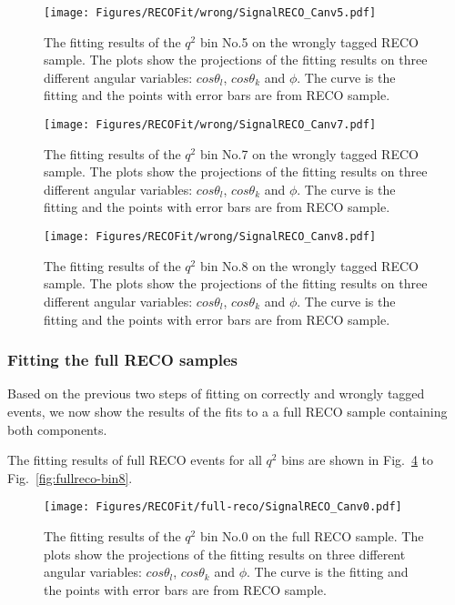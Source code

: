 \begin{figure}[!hbt]
  \centering
  \texttt{[image: Figures/RECOFit/wrong/SignalRECO\_Canv5.pdf]}
  \caption{The fitting results of the $q^2$ bin No.5 on the wrongly
    tagged RECO  sample. The plots show the projections of the fitting results on
    three different angular variables: $cos\theta_l$, $cos\theta_k$
    and $\phi$. The curve is the fitting and the points with error
    bars are from RECO sample. } 
  \label{fig:wtag-bin5}
\end{figure}

\begin{figure}[!hbt]
  \centering
  \texttt{[image: Figures/RECOFit/wrong/SignalRECO\_Canv7.pdf]}
  \caption{The fitting results of the $q^2$ bin No.7 on the wrongly
    tagged RECO  sample. The plots show the projections of the fitting results on
    three different angular variables: $cos\theta_l$, $cos\theta_k$
    and $\phi$. The curve is the fitting and the points with error
    bars are from RECO sample. } 
  \label{fig:wtag-bin7}
\end{figure}

\begin{figure}[!hbt]
  \centering
  \texttt{[image: Figures/RECOFit/wrong/SignalRECO\_Canv8.pdf]}
  \caption{The fitting results of the $q^2$ bin No.8 on the wrongly
    tagged RECO  sample. The plots show the projections of the fitting results on
    three different angular variables: $cos\theta_l$, $cos\theta_k$
    and $\phi$. The curve is the fitting and the points with error
    bars are from RECO sample. } 
  \label{fig:wtag-bin8}
\end{figure}

\clearpage

\subsubsection{Fitting the full RECO samples}
\label{sec:fitval-reco-full}

Based on the previous two steps of fitting on correctly and wrongly tagged events,
we now show the results of the fits to a a full RECO sample containing both components.

The fitting results of full RECO events for all $q^2$ bins are
shown in Fig.~\ref{fig:fullreco-bin0} to Fig.~\ref{fig:fullreco-bin8}.


\begin{figure}[!hbt]
  \centering
  \texttt{[image: Figures/RECOFit/full-reco/SignalRECO\_Canv0.pdf]}
  \caption{The fitting results of the $q^2$ bin No.0 on the full RECO
    sample. The plots show the projections of the fitting results on
    three different angular variables: $cos\theta_l$, $cos\theta_k$
    and $\phi$. The curve is the fitting and the points with error
    bars are from RECO sample. }
  \label{fig:fullreco-bin0}
\end{figure}


